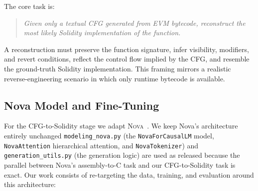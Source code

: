 \documentclass{article}
\begin{document}
The core task is:

\begin{quote}
\textit{Given only a textual CFG generated from EVM bytecode, reconstruct the most
likely Solidity implementation of the function.}
\end{quote}

A reconstruction must preserve the function signature, infer visibility, modifiers,
and revert conditions, reflect the control flow implied by the CFG, and resemble
the ground-truth Solidity implementation. This framing mirrors a realistic
reverse-engineering scenario in which only runtime bytecode is available.

\subsection{Nova Model and Fine-Tuning}
\label{sec:nova}

For the CFG-to-Solidity stage we adapt \textsc{Nova}~\cite{jiang2025nova}. We keep
Nova's architecture entirely unchanged \texttt{modeling\_nova.py} (the
\texttt{NovaForCausalLM} model, \texttt{NovaAttention} hierarchical attention, and
\texttt{NovaTokenizer}) and \texttt{generation\_utils.py} (the generation logic)
are used as released because the parallel between Nova's assembly-to-C task and our
CFG-to-Solidity task is exact. Our work consists of re-targeting the data,
training, and evaluation around this architecture:
\end{document}
